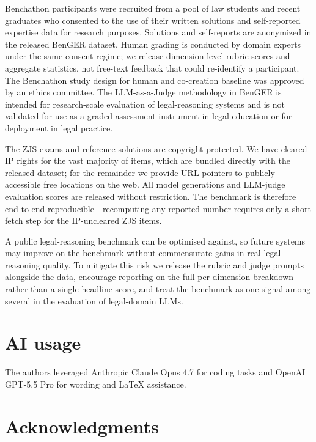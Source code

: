 \documentclass[11pt]{article}
\begin{document}
Benchathon participants were recruited from a pool of law students and
recent graduates who consented to the use of their written solutions and
self-reported expertise data for research purposes. Solutions and
self-reports are anonymized in the released BenGER dataset. Human
grading is conducted by domain experts under the same consent regime; we
release dimension-level rubric scores and aggregate statistics, not
free-text feedback that could re-identify a participant. The Benchathon
study design for human and co-creation baseline was approved by an
ethics committee. The LLM-as-a-Judge methodology in BenGER is intended
for research-scale evaluation of legal-reasoning systems and is not
validated for use as a graded assessment instrument in legal education
or for deployment in legal practice.

The ZJS exams and reference solutions are copyright-protected. We have
cleared IP rights for the vast majority of items, which are bundled
directly with the released dataset; for the remainder we provide URL
pointers to publicly accessible free locations on the web. All model
generations and LLM-judge evaluation scores are released without
restriction. The benchmark is therefore end-to-end reproducible -
recomputing any reported number requires only a short fetch step for the
IP-uncleared ZJS items.

A public legal-reasoning benchmark can be optimised against, so future
systems may improve on the benchmark without commensurate gains in real
legal-reasoning quality. To mitigate this risk we release the rubric and
judge prompts alongside the data, encourage reporting on the full
per-dimension breakdown rather than a single headline score, and treat
the benchmark as one signal among several in the evaluation of
legal-domain LLMs.

\section*{AI usage}\label{ai-usage}

The authors leveraged Anthropic Claude Opus 4.7 for coding tasks and
OpenAI GPT-5.5 Pro for wording and LaTeX assistance.

\section*{Acknowledgments}\label{acknowledgments}
\end{document}
